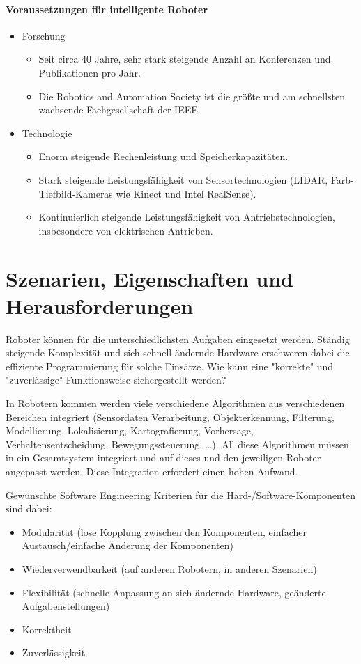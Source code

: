 	\paragraph{Voraussetzungen für intelligente Roboter}
		\begin{itemize}
			\item Forschung
				\begin{itemize}
					\item Seit circa 40 Jahre, sehr stark steigende Anzahl an Konferenzen und Publikationen pro Jahr.
					\item Die Robotics and Automation Society ist die größte und am schnellsten wachsende Fachgesellschaft der IEEE.
				\end{itemize}
			\item Technologie
				\begin{itemize}
					\item Enorm steigende Rechenleistung und Speicherkapazitäten.
					\item Stark steigende Leistungsfähigkeit von Sensortechnologien (\zB LIDAR, Farb-Tiefbild-Kameras wie Kinect und Intel RealSense).
					\item Kontinuierlich steigende Leistungsfähigkeit von Antriebstechnologien, insbesondere von elektrischen Antrieben.
				\end{itemize}
		\end{itemize}

	\section{Szenarien, Eigenschaften und Herausforderungen}
		Roboter können für die unterschiedlichsten Aufgaben eingesetzt werden. Ständig steigende Komplexität und sich schnell ändernde Hardware erschweren dabei die effiziente Programmierung für solche Einsätze. Wie kann eine "korrekte" und "zuverlässige" Funktionsweise sichergestellt werden?

		In Robotern kommen werden viele verschiedene Algorithmen aus verschiedenen Bereichen integriert (Sensordaten Verarbeitung, Objekterkennung, Filterung, Modellierung, Lokalisierung, Kartografierung, Vorhersage, Verhaltensentscheidung, Bewegungssteuerung, \dots). All diese Algorithmen müssen in ein Gesamtsystem integriert und auf dieses und den jeweiligen Roboter angepasst werden. Diese Integration erfordert einen hohen Aufwand.

		Gewünschte Software Engineering Kriterien für die Hard-/Software-Komponenten sind dabei:
		\begin{itemize}
			\item Modularität (lose Kopplung zwischen den Komponenten, einfacher Austausch/einfache Änderung der Komponenten)
			\item Wiederverwendbarkeit (auf anderen Robotern, in anderen Szenarien)
			\item Flexibilität (schnelle Anpassung an sich ändernde Hardware, geänderte Aufgabenstellungen)
			\item Korrektheit
			\item Zuverlässigkeit
		\end{itemize}

